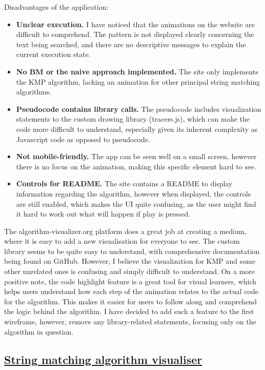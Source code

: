 Disadvantages of the application:
\begin{itemize}
    \item \textbf{Unclear execution.} I have noticed that the animations on the website are difficult to comprehend. The pattern is not displayed clearly concerning the text being searched, and there are no descriptive messages to explain the current execution state.
    \item \textbf{No BM or the naive approach implemented.} The site only implements the KMP algorithm, lacking an animation for other principal string matching algorithms.
    \item \textbf{Pseudocode contains library calls.} The pseudocode includes visualization statements to the custom drawing library (tracers.js), which can make the code more difficult to understand, especially given its inherent complexity as Javascript code as opposed to pseudocode.
    \item \textbf{Not mobile-friendly.} The app can be seen well on a small screen, however there is no focus on the animation, making this specific element hard to see.
    \item \textbf{Controls for README.} The site contains a README to display information regarding the algorithm, however when displayed, the controls are still enabled, which makes the UI quite confusing, as the user might find it hard to work out what will happen if play is pressed.
\end{itemize}


The algorithm-visualizer.org platform does a great job at creating a medium, where it is easy to add a new visualisation for everyone to see. The custom library seems to be quite easy to understand, with comprehensive documentation being found on GitHub. However, I believe the visualization for KMP and some other unrelated ones is confusing and simply difficult to understand. On a more positive note, the code highlight feature is a great tool for visual learners, which helps users understand how each step of the animation relates to the actual code for the algorithm. This makes it easier for users to follow along and comprehend the logic behind the algorithm. I have decided to add such a feature to the first wireframe, however, remove any library-related statements, focusing only on the algorithm in question.


\subsection{\href{https://lobb.nz/stringmatchvisualiser/stringmatching.html}{String matching algorithm visualiser}}

